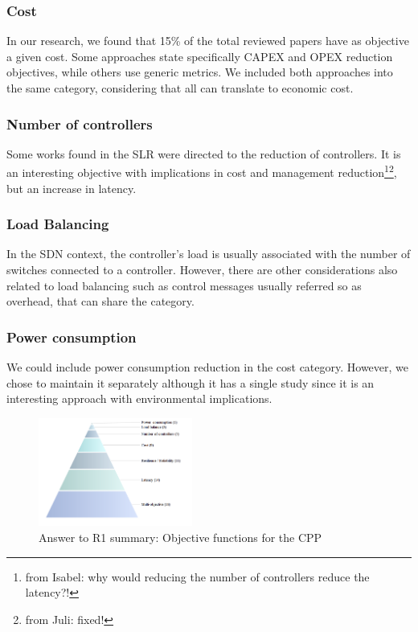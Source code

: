 \documentclass{IEEEtran}
\newcommand\fia[1]{{\color{red}\footnote{\color{red}from Isabel: #1}}} %
\newcommand\juli[1]{{\color{magenta}\footnote{\color{magenta}from Juli: #1}}}
\newcommand\mia[1]{{\color{red}#1}}%
\begin{document}
\subsubsection{Cost}
In our research, we found that 15\% of the total \mia{reviewed} papers \mia{have as objective} \mia{a given} cost. Some approaches \mia{state} specifically CAPEX and OPEX \mia{reduction objectives}, while others use generic metrics. We included both approaches into the same category, considering that all can translate to economic cost. 

\subsubsection{Number of controllers}
Some works found in the SLR were directed to the reduction of controllers. It is an interesting objective with implications in cost and management  reduction\fia{why would reducing the number of controllers reduce the latency?!}\juli{fixed!}, but an increase in latency. 
\subsubsection{Load Balancing}
In \mia{the} SDN context, the \mia{controller's} load is usually associated with the number of switches connected to a controller. However, there are other considerations also related to load balancing such as control messages \mia{usually referred so as} overhead, that can share the category. 
\subsubsection{Power consumption}
We could include power consumption reduction in the cost category. However, we chose to maintain it separately although it has a single study since it is an interesting approach with environmental implications.
\begin{figure}
    \centering
    \includegraphics[width=0.45\textwidth]{Pictures/categories.png}
    \caption{\mia{Answer to R1 summary:} Objective functions for the CPP}
    \label{fig:pyramid_purposes}
\end{figure}
\end{document}
